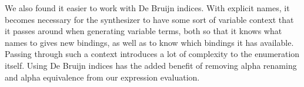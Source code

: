 We also found it easier to work with De Bruijn indices.
%
With explicit names, it becomes necessary for the
synthesizer to have some sort of variable context that it
passes around when generating variable terms, both so that
it knows what names to gives new bindings, as well as to
know which bindings it has available.
%
Passing through such a context introduces a lot of
complexity to the enumeration itself.
%
Using De Bruijn indices has the added benefit of removing
alpha renaming and alpha equivalence from our expression
evaluation.

